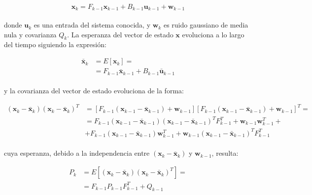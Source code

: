 \begin{equation}
	\boldsymbol{x}_k = F_{k-1}\boldsymbol{x}_{k-1} + B_{k-1}\boldsymbol{u}_{k-1} + \boldsymbol{w}_{k-1}
\end{equation} \\
\noindent
donde $\boldsymbol{u}_k$ es una entrada del sistema conocida, y $\boldsymbol{w}_k$ es ruido gaussiano de media nula y covarianza $Q_k$. La esperanza del vector de estado $\boldsymbol{x}$ evoluciona a lo largo del tiempo siguiendo la expresión: 

\begin{equation}
\begin{split}
	\boldsymbol{\bar{x}}_k &= E[\boldsymbol{x}_k] = \\
	&= F_{k-1}\boldsymbol{\bar{x}}_{k-1} + B_{k-1}\boldsymbol{\bar{u}}_{k-1}
\end{split}
\end{equation} \\
\noindent
y la covarianza del vector de estado evoluciona de la forma:

\begin{equation}
\begin{split}
	(\boldsymbol{x}_k - \boldsymbol{\bar{x}}_k)(\boldsymbol{x}_k - \boldsymbol{\bar{x}}_k)^T &= [F_{k-1}(\boldsymbol{x}_{k-1} - \boldsymbol{\bar{x}}_{k-1}) + \boldsymbol{w}_{k-1}] [F_{k-1}(\boldsymbol{x}_{k-1} - \boldsymbol{\bar{x}}_{k-1}) + \boldsymbol{w}_{k-1}]^T = \\
	&= F_{k-1}(\boldsymbol{x}_{k-1} - \boldsymbol{\bar{x}}_{k-1})(\boldsymbol{x}_{k-1} - \boldsymbol{\bar{x}}_{k-1})^TF_{k-1}^T + \boldsymbol{w}_{k-1}\boldsymbol{w}_{k-1}^T + \\
	&+ F_{k-1}(\boldsymbol{x}_{k-1} - \boldsymbol{\bar{x}}_{k-1})\boldsymbol{w}_{k-1}^T + \boldsymbol{w}_{k-1}(\boldsymbol{x}_{k-1} - \boldsymbol{\bar{x}}_{k-1})^TF_{k-1}^T
\end{split}
\end{equation} \\
\noindent
cuya esperanza, debido a la independencia entre $(\boldsymbol{x}_k - \boldsymbol{\bar{x}}_k)$ y $\boldsymbol{w}_{k-1}$, resulta:

\begin{equation}
\begin{split}
	P_k &= E[(\boldsymbol{x}_k - \boldsymbol{\bar{x}}_k)(\boldsymbol{x}_k - \boldsymbol{\bar{x}}_k)^T] = \\
	&= F_{k-1}P_{k-1}F_{k-1}^T + Q_{k-1}
\end{split}
\end{equation}

